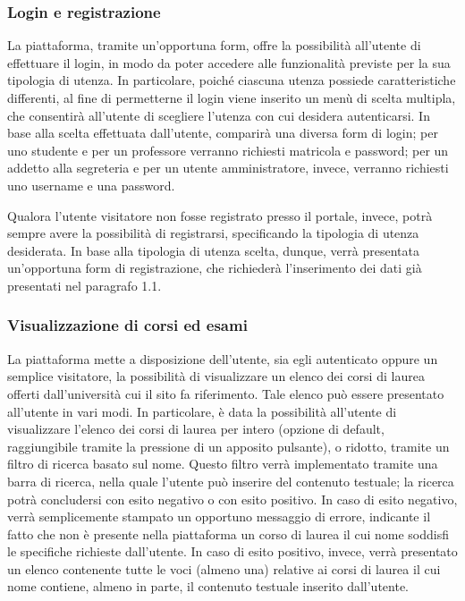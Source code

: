 \documentclass [a4paper,11pt]{book}
\begin{document}
\subsubsection{Login e registrazione}

La piattaforma, tramite un'opportuna form, offre la possibilità all'utente di effettuare il login, in modo da poter accedere alle funzionalità previste per la sua tipologia di utenza. In particolare, poiché ciascuna utenza possiede caratteristiche differenti, al fine di permetterne il login viene inserito un menù di scelta multipla, che consentirà all'utente di scegliere l'utenza con cui desidera autenticarsi. In base alla scelta effettuata dall'utente, comparirà una diversa form di login; per uno studente e per un professore verranno richiesti matricola e password; per un addetto alla segreteria e per un utente amministratore, invece, verranno richiesti uno username e una password.

Qualora l'utente visitatore non fosse registrato presso il portale, invece, potrà sempre avere la possibilità di registrarsi, specificando la tipologia di utenza desiderata. In base alla tipologia di utenza scelta, dunque, verrà presentata un'opportuna form di registrazione, che richiederà l'inserimento dei dati già presentati nel paragrafo 1.1.

\medskip

\subsubsection{Visualizzazione di corsi ed esami}

La piattaforma mette a disposizione dell'utente, sia egli autenticato oppure un semplice visitatore, la possibilità di visualizzare un elenco dei corsi di laurea offerti dall'università cui il sito fa riferimento. Tale elenco può essere presentato all'utente in vari modi. In particolare, è data la possibilità all'utente di visualizzare l'elenco dei corsi di laurea per intero (opzione di default, raggiungibile tramite la pressione di un apposito pulsante), o ridotto, tramite un filtro di ricerca basato sul nome. Questo filtro verrà implementato tramite una barra di ricerca, nella quale l'utente può inserire del contenuto testuale; la ricerca potrà concludersi con esito negativo o con esito positivo. In caso di esito negativo, verrà semplicemente stampato un opportuno messaggio di errore, indicante il fatto che non è presente nella piattaforma un corso di laurea il cui nome soddisfi le specifiche richieste dall'utente. In caso di esito positivo, invece, verrà presentato un elenco contenente tutte le voci (almeno una) relative ai corsi di laurea il cui nome contiene, almeno in parte, il contenuto testuale inserito dall'utente.
\end{document}
